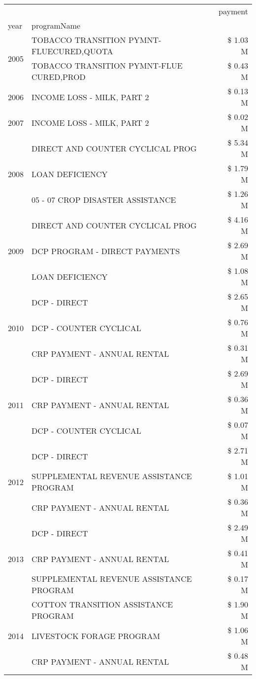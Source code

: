 \begin{tabular}{llr}
\toprule
 &  & payment \\
year & programName &  \\
\midrule
\multirow[t]{2}{*}{2005} & TOBACCO TRANSITION PYMNT-FLUECURED,QUOTA & \$ 1.03 M \\
 & TOBACCO TRANSITION PYMNT-FLUE CURED,PROD & \$ 0.43 M \\
\cline{1-3}
2006 & INCOME LOSS - MILK, PART 2 & \$ 0.13 M \\
\cline{1-3}
2007 & INCOME LOSS - MILK, PART 2 & \$ 0.02 M \\
\cline{1-3}
\multirow[t]{3}{*}{2008} & DIRECT AND COUNTER CYCLICAL PROG & \$ 5.34 M \\
 & LOAN DEFICIENCY & \$ 1.79 M \\
 & 05 - 07 CROP DISASTER ASSISTANCE & \$ 1.26 M \\
\cline{1-3}
\multirow[t]{3}{*}{2009} & DIRECT AND COUNTER CYCLICAL PROG & \$ 4.16 M \\
 & DCP PROGRAM - DIRECT PAYMENTS & \$ 2.69 M \\
 & LOAN DEFICIENCY & \$ 1.08 M \\
\cline{1-3}
\multirow[t]{3}{*}{2010} & DCP - DIRECT & \$ 2.65 M \\
 & DCP - COUNTER CYCLICAL & \$ 0.76 M \\
 & CRP PAYMENT - ANNUAL RENTAL & \$ 0.31 M \\
\cline{1-3}
\multirow[t]{3}{*}{2011} & DCP - DIRECT & \$ 2.69 M \\
 & CRP PAYMENT - ANNUAL RENTAL & \$ 0.36 M \\
 & DCP - COUNTER CYCLICAL & \$ 0.07 M \\
\cline{1-3}
\multirow[t]{3}{*}{2012} & DCP - DIRECT & \$ 2.71 M \\
 & SUPPLEMENTAL REVENUE ASSISTANCE PROGRAM & \$ 1.01 M \\
 & CRP PAYMENT - ANNUAL RENTAL & \$ 0.36 M \\
\cline{1-3}
\multirow[t]{3}{*}{2013} & DCP - DIRECT & \$ 2.49 M \\
 & CRP PAYMENT - ANNUAL RENTAL & \$ 0.41 M \\
 & SUPPLEMENTAL REVENUE ASSISTANCE PROGRAM & \$ 0.17 M \\
\cline{1-3}
\multirow[t]{3}{*}{2014} & COTTON TRANSITION ASSISTANCE PROGRAM & \$ 1.90 M \\
 & LIVESTOCK FORAGE PROGRAM & \$ 1.06 M \\
 & CRP PAYMENT - ANNUAL RENTAL & \$ 0.48 M \\

\end{tabular}
